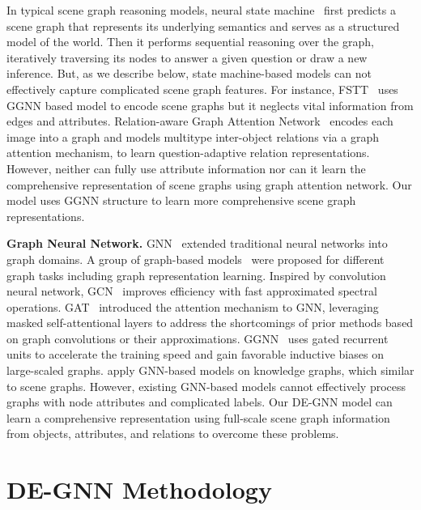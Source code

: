 \documentclass[letterpaper]{article} %
\begin{document}
In typical scene graph reasoning models, neural state machine~\cite{DBLP:conf/nips/HudsonM19} first predicts a scene graph that represents its underlying semantics and serves as a structured model of the world. 
Then it performs sequential reasoning over the graph, iteratively traversing its nodes to answer a given question or draw a new inference. 
But, as we describe below, state machine-based models can not effectively capture complicated scene graph features.
For instance, FSTT~\cite{inproceedings} uses GGNN based model to encode scene graphs but it neglects vital information from edges and attributes. Relation-aware Graph Attention Network~\cite{DBLP:conf/iccv/LiGCL19} encodes each image into a graph and models multitype inter-object relations via a graph attention mechanism, to learn question-adaptive relation representations. However, neither can fully use attribute information nor can it learn the comprehensive representation of scene graphs using graph attention network. 
Our model uses GGNN structure to learn more comprehensive scene graph representations. 

\vspace{0.05in}
\noindent\textbf{Graph Neural Network.}
GNN~\cite{DBLP:journals/tnn/ScarselliGTHM09} extended traditional neural networks into graph domains. A group of graph-based models~\cite{DBLP:conf/aaai/0001RFHLRG19,DBLP:conf/aaai/LiuCLZLSQ19} were proposed for different graph tasks including graph representation learning. Inspired by convolution neural network, GCN~\cite{DBLP:conf/iclr/KipfW17} improves efficiency with fast approximated spectral operations. GAT~\cite{DBLP:conf/iclr/VelickovicCCRLB18} introduced the attention mechanism to GNN, leveraging masked self-attentional layers to address the shortcomings of prior methods based on graph convolutions or their approximations. GGNN~\cite{DBLP:journals/corr/LiTBZ15} uses gated recurrent units to accelerate the training speed and gain favorable inductive biases on large-scaled graphs.
\cite{DBLP:conf/cncl/WangGCL16,DBLP:conf/aaai/WangCGL18,DBLP:conf/aistats/SunL19} apply GNN-based models on knowledge graphs, which similar to scene graphs.
However, existing GNN-based models cannot effectively process graphs with node attributes and complicated labels. Our DE-GNN model can learn a comprehensive representation using full-scale scene graph information from objects, attributes, and relations to overcome these problems.

\section{DE-GNN Methodology}
\end{document}
